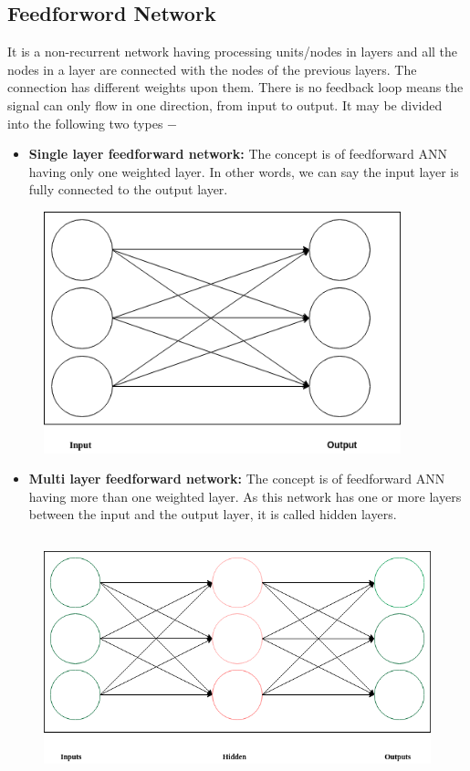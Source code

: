 \documentclass{report}
\begin{document}
\subsection{Feedforword Network}
It is a non-recurrent network having processing units/nodes in layers and all the nodes in a layer are connected with the nodes of the previous layers. The connection has different weights upon them. There is no feedback loop means the signal can only flow in one direction, from input to output. It may be divided into the following two types −

\begin{itemize}
\item \textbf{Single layer feedforward network: } The concept is of feedforward ANN having only one weighted layer. In other words, we can say the input layer is fully connected to the output layer.

\end{itemize}

\begin{figure}[htbp]
\centering
\includegraphics[height=7cm]{Pictures/Single layer feedforward network.png}
\caption{}
\label{}
\end{figure}

\begin{itemize}
\item \textbf{Multi layer feedforward network: } The concept is of feedforward ANN having more than one weighted layer. As this network has one or more layers between the input and the output layer, it is called hidden layers.


\end{itemize}

\begin{figure}[htbp]
\centering
\includegraphics[height=7cm]{Pictures/Multilayer feedforward network.png}
\caption{}
\label{}
\end{figure}
\end{document}
